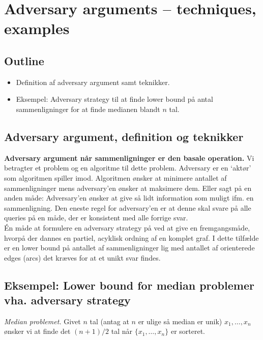\section{Adversary arguments -- techniques, examples}

\subsection*{Outline}

\begin{itemize}
	\item Definition af adversary argument samt teknikker. 
	\item Eksempel: Adversary strategy til at finde lower bound på antal sammenligninger for at finde medianen blandt $n$ tal.
\end{itemize}

\subsection*{Adversary argument, definition og teknikker}

\textbf{Adversary argument når sammenligninger er den basale operation.} Vi betragter et problem og en algoritme til dette problem. Adversary er en `aktør' som algoritmen spiller imod. Algoritmen ønsker at minimere antallet af sammenligninger mens adversary'en ønsker at maksimere dem. Eller sagt på en anden måde: Adversary'en ønsker at give så lidt information som muligt ifm. en sammenligning. Den eneste regel for adversary'en er at denne skal svare på alle queries på en måde, der er konsistent med alle forrige svar. \\

Én måde at formulere en adversary strategy på ved at give en fremgangsmåde, hvorpå der dannes en partiel, acyklisk ordning af en komplet graf. I dette tilfælde er en lower bound på antallet af sammenligninger lig med antallet af orienterede edges (arcs) det kræves for at et unikt svar findes.

\subsection*{Eksempel: Lower bound for median problemer vha. adversary strategy}

\textit{Median problemet.} Givet $n$ tal (antag at $n$ er ulige så median er unik) $x_1,\ldots,x_n$ ønsker vi at finde det $(n+1)/2$ tal når $\{x_1,\ldots,x_n\}$ er sorteret. \\

